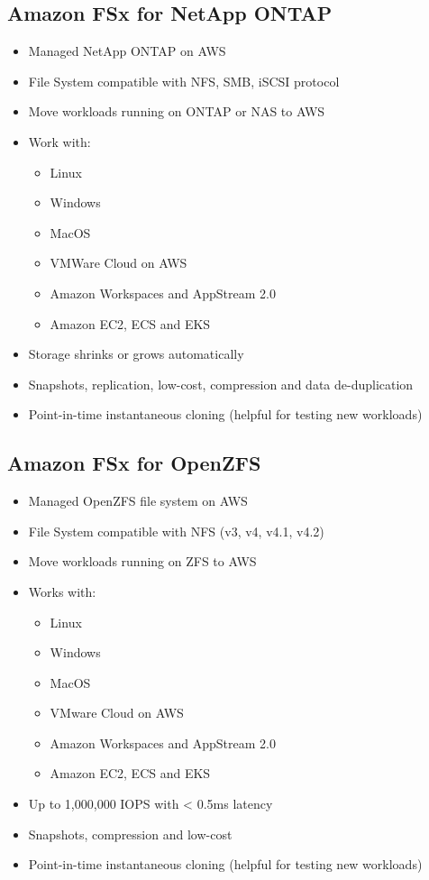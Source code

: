 \subsection{Amazon FSx for NetApp ONTAP}
\begin{itemize}
    \item Managed NetApp ONTAP on AWS
    \item File System compatible with NFS, SMB, iSCSI protocol
    \item Move workloads running on ONTAP or NAS to AWS
    \item Work with:
    \begin{itemize}
        \item Linux
        \item Windows
        \item MacOS
        \item VMWare Cloud on AWS
        \item Amazon Workspaces and AppStream 2.0
        \item Amazon EC2, ECS and EKS
    \end{itemize}
    \item Storage shrinks or grows automatically
    \item Snapshots, replication, low-cost, compression and data de-duplication
    \item Point-in-time instantaneous cloning (helpful for testing new workloads)
\end{itemize}

\subsection{Amazon FSx for OpenZFS}
\begin{itemize}
    \item Managed OpenZFS file system on AWS
    \item File System compatible with NFS (v3, v4, v4.1, v4.2)
    \item Move workloads running on ZFS to AWS
    \item Works with:
    \begin{itemize}
        \item Linux
        \item Windows
        \item MacOS
        \item VMware Cloud on AWS
        \item Amazon Workspaces and AppStream 2.0
        \item Amazon EC2, ECS and EKS
    \end{itemize}
    \item Up to 1,000,000 IOPS with < 0.5ms latency
    \item Snapshots, compression and low-cost
    \item Point-in-time instantaneous cloning (helpful for testing new workloads)
\end{itemize}


